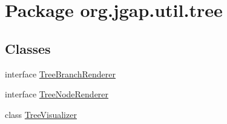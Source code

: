 \hypertarget{namespaceorg_1_1jgap_1_1util_1_1tree}{\section{Package org.\-jgap.\-util.\-tree}
\label{namespaceorg_1_1jgap_1_1util_1_1tree}
}
\subsection*{Classes}
\begin{DoxyCompactItemize}
\item 
interface \hyperlink{interfaceorg_1_1jgap_1_1util_1_1tree_1_1_tree_branch_renderer}{Tree\-Branch\-Renderer}
\item 
interface \hyperlink{interfaceorg_1_1jgap_1_1util_1_1tree_1_1_tree_node_renderer}{Tree\-Node\-Renderer}
\item 
class \hyperlink{classorg_1_1jgap_1_1util_1_1tree_1_1_tree_visualizer}{Tree\-Visualizer}
\end{DoxyCompactItemize}
